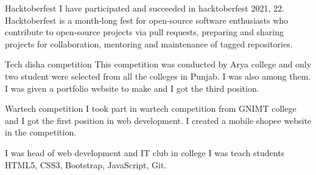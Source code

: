     {Hacktoberfest}
    {}
    {}
    {}
    {I have participated and succeeded in hacktoberfest 2021, 22. Hacktoberfest is a month-long fest for open-source software enthusiasts who contribute to open-source projects via pull requests, preparing and sharing projects for collaboration, mentoring and maintenance of tagged repositories.}
    {}


    {Tech disha competition}
    {}
    {}
    {}
    {This competition was conducted by Arya college and only two student were selected from all the colleges in Punjab. I was also among them. I was given a portfolio website to make and I got the third position.}
    {}

    
    {Wartech competition}
    {}
    {}
    {}
    {I took part in wartech competition from GNIMT college and I got the first position in web development. I created a mobile shopee website in the competition.}
    {}



    {I was head of web development and IT club in college}
    {}
    {}
    {}
    {I was teach students HTML5, CSS3, Bootstrap, JavaScript, Git.}
    {}

